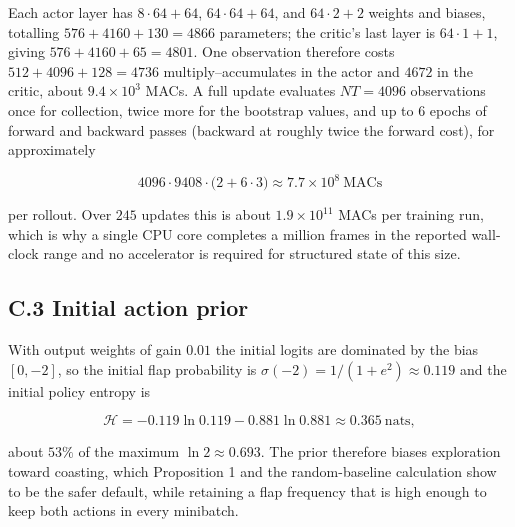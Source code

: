 \documentclass[
  11pt,
]{article}
\begin{document}
Each actor layer has \(8\cdot64+64\), \(64\cdot64+64\), and
\(64\cdot2+2\) weights and biases, totalling \(576+4160+130=4866\)
parameters; the critic's last layer is \(64\cdot1+1\), giving
\(576+4160+65=4801\). One observation therefore costs
\(512+4096+128=4736\) multiply--accumulates in the actor and \(4672\) in
the critic, about \(9.4\times10^3\) MACs. A full update evaluates
\(NT=4096\) observations once for collection, twice more for the
bootstrap values, and up to \(6\) epochs of forward and backward passes
(backward at roughly twice the forward cost), for approximately

\[
4096\cdot9408\cdot\bigl(2+6\cdot3\bigr)\approx 7.7\times10^{8}\ \text{MACs}
\]

per rollout. Over \(245\) updates this is about \(1.9\times10^{11}\)
MACs per training run, which is why a single CPU core completes a
million frames in the reported wall-clock range and no accelerator is
required for structured state of this size.

\subsection{C.3 Initial action prior}\label{c.3-initial-action-prior}

With output weights of gain \(0.01\) the initial logits are dominated by
the bias \([0,-2]\), so the initial flap probability is
\(\sigma(-2)=1/(1+e^{2})\approx0.119\) and the initial policy entropy is

\[
\mathcal H=-0.119\ln 0.119-0.881\ln 0.881\approx0.365\ \text{nats},
\]

about \(53\%\) of the maximum \(\ln2\approx0.693\). The prior therefore
biases exploration toward coasting, which Proposition 1 and the
random-baseline calculation show to be the safer default, while
retaining a flap frequency that is high enough to keep both actions in
every minibatch.
\end{document}

